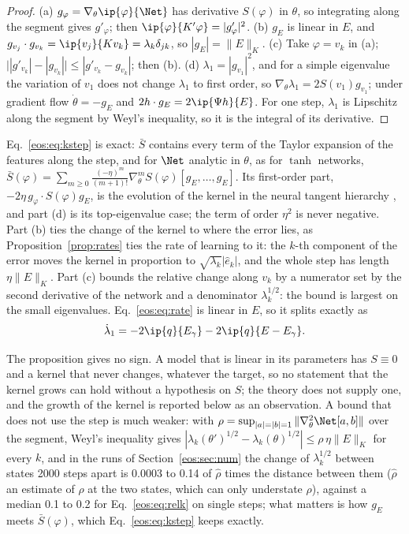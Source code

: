 \begin{proof}
(a) $g_\varphi = \nabla_\theta\ip{\varphi}{\Net}$ has derivative $S(\varphi)$ in $\theta$, so integrating along the segment gives $g'_\varphi$; then $\ip{\varphi}{K'\varphi} = |g'_\varphi|^2$.
(b) $g_E$ is linear in $E$, and $g_{v_j}\cdot g_{v_k} = \ip{v_j}{Kv_k} = \lambda_k\delta_{jk}$, so $|g_E| = \|E\|_K$.
(c) Take $\varphi = v_k$ in (a); $\big||g'_{v_k}| - |g_{v_k}|\big|\le|g'_{v_k} - g_{v_k}|$; then (b).
(d) $\lambda_1 = |g_{v_1}|^2$, and for a simple eigenvalue the variation of $v_1$ does not change $\lambda_1$ to first order, so $\nabla_\theta\lambda_1 = 2S(v_1)g_{v_1}$; under gradient flow $\dot\theta = -g_E$ and $2h\cdot g_E = 2\ip{\Psi h}{E}$. For one step, $\lambda_1$ is Lipschitz along the segment by Weyl's inequality, so it is the integral of its derivative.
\end{proof}

Eq.~\eqref{eos:eq:kstep} is exact: $\bar S$ contains every term of the Taylor expansion of the features along the step, and for $\Net$ analytic in $\theta$, as for $\tanh$ networks, $\bar S(\varphi) = \sum_{m\ge0}\frac{(-\eta)^m}{(m+1)!}\nabla^m_\theta S(\varphi)[g_E,\dots,g_E]$.
Its first-order part, $-2\eta\,g_\varphi\cdot S(\varphi)g_E$, is the evolution of the kernel in the neural tangent hierarchy \cite{huangyau2020}, and part (d) is its top-eigenvalue case; the term of order $\eta^2$ is never negative.
Part (b) ties the change of the kernel to where the error lies, as Proposition~\ref{prop:rates} ties the rate of learning to it: the $k$-th component of the error moves the kernel in proportion to $\sqrt{\lambda_k}|\hat e_k|$, and the whole step has length $\eta\|E\|_K$.
Part (c) bounds the relative change along $v_k$ by a numerator set by the second derivative of the network and a denominator $\lambda_k^{1/2}$: the bound is largest on the small eigenvalues.
Eq.~\eqref{eos:eq:rate} is linear in $E$, so it splits exactly as
\begin{equation}\label{eos:eq:split}
\dot\lambda_1 = -2\ip{q}{E_\gamma} - 2\ip{q}{E - E_\gamma}.
\end{equation}

The proposition gives no sign.
A model that is linear in its parameters has $S\equiv0$ and a kernel that never changes, whatever the target, so no statement that the kernel grows can hold without a hypothesis on $S$; the theory does not supply one, and the growth of the kernel is reported below as an observation.
A bound that does not use the step is much weaker: with $\rho = \sup_{|a| = |b| = 1}\|\nabla^2_\theta\Net[a,b]\|$ over the segment, Weyl's inequality gives $|\lambda_k(\theta')^{1/2} - \lambda_k(\theta)^{1/2}|\le\rho\,\eta\|E\|_K$ for every $k$, and in the runs of Section~\ref{eos:sec:num} the change of $\lambda_k^{1/2}$ between states 2000 steps apart is 0.0003 to 0.14 of $\hat\rho$ times the distance between them ($\hat\rho$ an estimate of $\rho$ at the two states, which can only understate $\rho$), against a median 0.1 to 0.2 for Eq.~\eqref{eos:eq:relk} on single steps; what matters is how $g_E$ meets $\bar S(\varphi)$, which Eq.~\eqref{eos:eq:kstep} keeps exactly.

